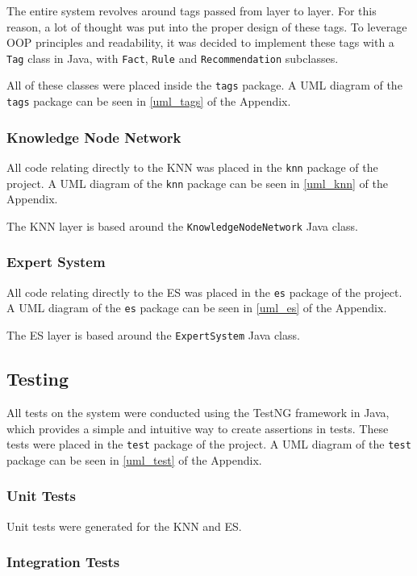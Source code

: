 \documentclass[titlepage,11pt]{article}
\newcommand{\code}[1]{\texttt{#1}}
\begin{document}
The entire system revolves around tags passed from layer to layer. For this reason, a lot of thought was put into the proper design of these tags. To leverage OOP principles and readability, it was decided to implement these tags with a \code{Tag} class in Java, with \code{Fact}, \code{Rule} and \code{Recommendation} subclasses.

All of these classes were placed inside the \code{tags} package. A UML diagram of the \code{tags} package can be seen in \autoref{uml_tags} of the Appendix.

\subsubsection{Knowledge Node Network}

All code relating directly to the KNN was placed in the \code{knn} package of the project. A UML diagram of the \code{knn} package can be seen in \autoref{uml_knn} of the Appendix.

The KNN layer is based around the \code{KnowledgeNodeNetwork} Java class.

\subsubsection{Expert System}

All code relating directly to the ES was placed in the \code{es} package of the project. A UML diagram of the \code{es} package can be seen in \autoref{uml_es} of the Appendix.

The ES layer is based around the \code{ExpertSystem} Java class.


\subsection{Testing}

All tests on the system were conducted using the TestNG framework in Java, which provides a simple and intuitive way to create assertions in tests. These tests were placed in the \code{test} package of the project. A UML diagram of the \code{test} package can be seen in \autoref{uml_test} of the Appendix.

\subsubsection{Unit Tests}

Unit tests were generated for the KNN and ES.

\subsubsection{Integration Tests}
\end{document}
